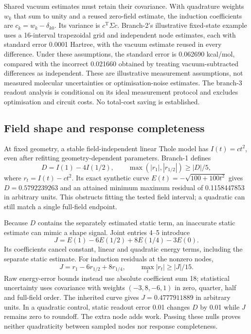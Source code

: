 \documentclass{article}
\begin{document}
Shared vacuum estimates must retain their covariance. With quadrature weights $w_k$ that sum to unity and a reused zero-field estimate, the induction coefficients are $c_k=w_k-\delta_{k0}$. Its variance is $c^{\mathrm T}\Sigma c$. Branch-2's illustrative fixed-state example uses a 16-interval trapezoidal grid and independent node estimates, each with standard error 0.0001 Hartree, with the vacuum estimate reused in every difference. Under these assumptions, the standard error is 0.062690 kcal/mol, compared with the incorrect 0.021660 obtained by treating vacuum-subtracted differences as independent. These are illustrative measurement assumptions, not measured molecular uncertainties or optimisation-noise estimates. The branch-3 readout analysis is conditional on its ideal measurement protocol and excludes optimisation and circuit costs. No total-cost saving is established.

\subsection{Field shape and response completeness}

At fixed geometry, a stable field-independent linear Thole model has $I(t)=ct^2$, even after refitting geometry-dependent parameters. Branch-1 defines
\begin{equation*}
D=I(1)-4I(1/2),\qquad
\max(|r_1|,|r_{1/2}|)\geq |D|/5,
\end{equation*}
where $r_t=I(t)-ct^2$. Its exact synthetic curve $E(t)=-\sqrt{100+100t^2}$ gives $D=0.5792239263$ and an attained minimum maximum residual of 0.1158447853 in arbitrary units. This obstructs fitting the tested field interval; a quadratic can still match a single full-field endpoint.

Because $D$ contains the separately estimated static term, an inaccurate static estimate can mimic a shape signal. Joint entries 4--5 introduce
\begin{equation*}
J=E(1)-6E(1/2)+8E(1/4)-3E(0).
\end{equation*}
Its coefficients cancel constant, linear and quadratic energy terms, including the separate static estimate. For induction residuals at the nonzero nodes,
\begin{equation*}
J=r_1-6r_{1/2}+8r_{1/4},\qquad \max_t|r_t|\geq |J|/15.
\end{equation*}
Raw energy-error bounds instead use absolute coefficient sum 18; statistical uncertainty uses covariance with weights $(-3,8,-6,1)$ in zero, quarter, half and full-field order. The inherited curve gives $J=0.4777911889$ in arbitrary units. In a quadratic control, static readout error 0.01 changes $D$ by 0.01 while $J$ remains zero to roundoff. The extra node adds work. Passing these nulls proves neither quadraticity between sampled nodes nor response completeness.
\end{document}
